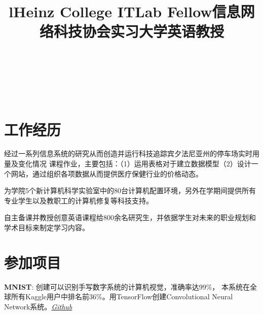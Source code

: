 \documentclass[margin]{res}
\begin{document}
\begin{CJK*}{UTF8}{gbsn}
\begin{resume}
\begin{format}
\title{l}\\
\\
\body\\
\end{format}

\section{工作经历}
\title{\textbf{Heinz College ITLab Fellow}}
\begin{position}
经过一系列信息系统的研究从而创造并运行科技追踪宾夕法尼亚州的停车场实时用量及变化情况
课程作业，主要包括：（1）运用表格对于建立数据模型（2）设计一个网站，通过组织各项数据从而提供医疗保健行业的价格动态。
\end{position}

\title{\textbf{信息网络科技协会实习}}
\begin{position}
为学院5个新计算机科学实验室中的80台计算机配置环境，另外在学期间提供所有专业学生以及教职工的计算机修复等科技支持。
\end{position}

\title{\textbf{大学英语教授}}
\begin{position}
自主备课并教授创意英语课程给800余名研究生，并依据学生对未来的职业规划和学术目标来制定学习内容。
\end{position}

\section{参加项目}
\par
\textbf{MNIST}:
创建可以识别手写数字系统的计算机视觉，准确率达99\%， 本系统在全球所有Kaggle用户中排名前36\%。用TensorFlow创建Convolutional Neural Network系统。\textit{\href{https://github.com/lucaskjaero/MNIST}{Github}}


\end{resume}
\end{CJK*}
\end{document}
